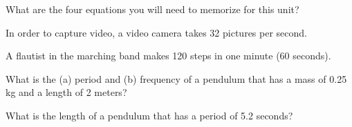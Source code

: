 \documentclass[10pt]{exam}
\begin{document}
\begin{questions}
\question
  What are the four equations you will need to memorize for this unit?
  \vs[2]

\pagebreak

\question
  In order to capture video, a video camera takes 32 pictures per second.



\question
  A flautist in the marching band makes 120 steps in one minute (60 seconds).



\question
  What is the (a) period and (b) frequency of a pendulum that has a mass of 0.25 kg and a length of 2 meters?
  \vs[3]

\question
  What is the length of a pendulum that has a period of 5.2 seconds?
  \vs[3]




\end{questions}
\end{document}
